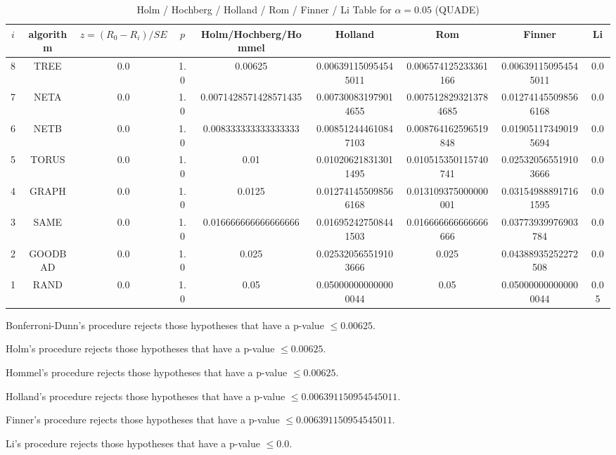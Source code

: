 \documentclass[a4paper,10pt]{article}
\begin{document}
\begin{landscape}
\begin{table}[!htp]
\centering\scriptsize
\caption{Holm / Hochberg / Holland / Rom / Finner / Li Table for $\alpha=0.05$ (QUADE)}
\begin{tabular}{ccccccccc}
$i$&algorithm&$z=(R_0 - R_i)/SE$&$p$&Holm/Hochberg/Hommel&Holland&Rom&Finner&Li\\
\hline
8& TREE&0.0&1.0&0.00625&0.006391150954545011&0.006574125233361166&0.006391150954545011&0.0\\
7& NETA&0.0&1.0&0.0071428571428571435&0.007300831979014655&0.0075128293213784685&0.012741455098566168&0.0\\
6& NETB&0.0&1.0&0.008333333333333333&0.008512444610847103&0.008764162596519848&0.019051173490195694&0.0\\
5& TORUS&0.0&1.0&0.01&0.010206218313011495&0.010515350115740741&0.025320565519103666&0.0\\
4& GRAPH&0.0&1.0&0.0125&0.012741455098566168&0.013109375000000001&0.031549888917161595&0.0\\
3& SAME&0.0&1.0&0.016666666666666666&0.016952427508441503&0.016666666666666666&0.03773939976903784&0.0\\
2& GOODBAD&0.0&1.0&0.025&0.025320565519103666&0.025&0.04388935252272508&0.0\\
1& RAND&0.0&1.0&0.05&0.050000000000000044&0.05&0.050000000000000044&0.05\\
\hline
\end{tabular}
\end{table}
Bonferroni-Dunn's procedure rejects those hypotheses that have a p-value $\le0.00625$.


Holm's procedure rejects those hypotheses that have a p-value $\le0.00625$.


Hommel's procedure rejects those hypotheses that have a p-value $\le0.00625$.


Holland's procedure rejects those hypotheses that have a p-value $\le0.006391150954545011$.


Finner's procedure rejects those hypotheses that have a p-value $\le0.006391150954545011$.


Li's procedure rejects those hypotheses that have a p-value $\le0.0$.



\newpage


\end{landscape}
\end{document}
